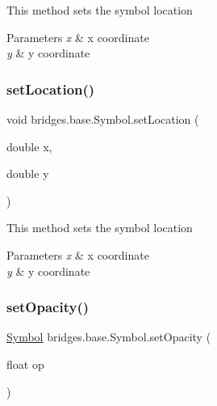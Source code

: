 This method sets the symbol location


\begin{DoxyParams}{Parameters}
{\em x} & x coordinate \\
\hline
{\em y} & y coordinate \\
\hline
\end{DoxyParams}
\mbox{\label{classbridges_1_1base_1_1_symbol_af4099c07f8d160321b48643512073591}} 
\subsubsection{\texorpdfstring{set\+Location()}{setLocation()}\hspace{0.1cm}{\footnotesize\ttfamily [2/2]}}
{\footnotesize\ttfamily void bridges.\+base.\+Symbol.\+set\+Location (\begin{DoxyParamCaption}\item[{double}]{x,  }\item[{double}]{y }\end{DoxyParamCaption})}

This method sets the symbol location


\begin{DoxyParams}{Parameters}
{\em x} & x coordinate \\
\hline
{\em y} & y coordinate \\
\hline
\end{DoxyParams}
\mbox{\label{classbridges_1_1base_1_1_symbol_abac237b439448cbef3744817d14061c5}} 
\subsubsection{\texorpdfstring{set\+Opacity()}{setOpacity()}}
{\footnotesize\ttfamily \hyperlink{classbridges_1_1base_1_1_symbol}{Symbol} bridges.\+base.\+Symbol.\+set\+Opacity (\begin{DoxyParamCaption}\item[{float}]{op }\end{DoxyParamCaption})}



